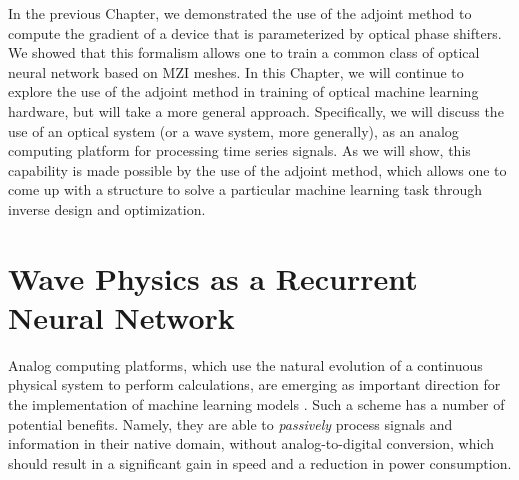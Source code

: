 In the previous Chapter, we demonstrated the use of the adjoint method to compute the gradient of a device that is parameterized by optical phase shifters.  We showed that this formalism allows one to train a common class of optical neural network based on MZI meshes.  In this Chapter, we will continue to explore the use of the adjoint method in training of optical machine learning hardware, but will take a more general approach.  Specifically, we will discuss the use of an optical system (or a wave system, more generally), as an analog computing platform for processing time series signals.  As we will show, this capability is made possible by the use of the adjoint method, which allows one to come up with a structure to solve a particular machine learning task through inverse design and optimization.



\section{Wave Physics as a Recurrent Neural Network}

Analog computing platforms, which use the natural evolution of a continuous physical system to perform calculations, are emerging as important direction for the implementation of machine learning models \cite{shen_deep_2017, biamonte_quantum_2017, laporte2018numerical, lin2018all, khoram_stochastic_2018}.
Such a scheme has a number of potential benefits. Namely, they are able to \textit{passively} process signals and information in their native domain, without analog-to-digital conversion, which should result in a significant gain in speed and a reduction in power consumption.

